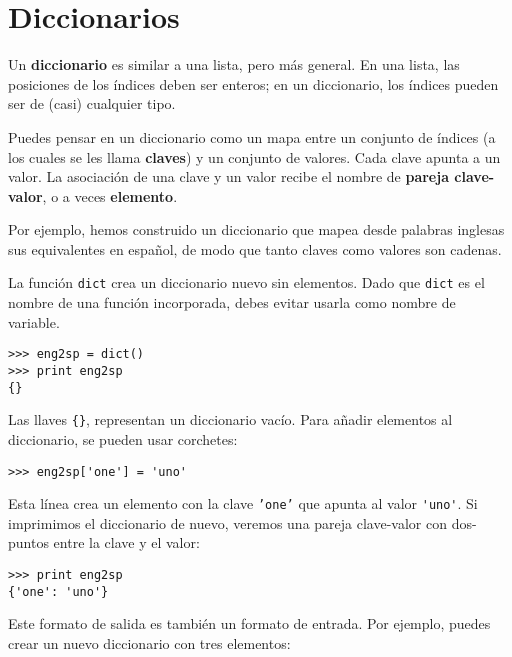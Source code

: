 
\chapter{Diccionarios}

Un {\bf diccionario} es similar a una lista, pero más general. En una lista,
las posiciones de los índices deben ser enteros; en un diccionario,
los índices pueden ser de (casi) cualquier tipo.

Puedes pensar en un diccionario como un mapa entre un conjunto de índices
(a los cuales se les llama {\bf claves}) y un conjunto de valores. Cada clave apunta a un
valor. La asociación de una clave y un valor recibe el nombre de {\bf
pareja clave-valor}, o a veces {\bf elemento}.

Por ejemplo, hemos construido un diccionario que mapea desde palabras inglesas
sus equivalentes en español, de modo que tanto claves como valores son cadenas.

La función {\tt dict} crea un diccionario nuevo sin elementos.
Dado que {\tt dict} es el nombre de una función incorporada, debes
evitar usarla como nombre de variable.


\beforeverb
\begin{verbatim}
>>> eng2sp = dict()
>>> print eng2sp
{}
\end{verbatim}
\afterverb

Las llaves \verb"{}", representan un diccionario vacío.
Para añadir elementos al diccionario, se pueden usar corchetes:


\beforeverb
\begin{verbatim}
>>> eng2sp['one'] = 'uno'
\end{verbatim}
\afterverb
%
Esta línea crea un elemento con la clave {\tt 'one'}
que apunta al valor \verb"'uno'". Si imprimimos el
diccionario de nuevo, veremos una pareja clave-valor con dos-puntos
entre la clave y el valor:

\beforeverb
\begin{verbatim}
>>> print eng2sp
{'one': 'uno'}
\end{verbatim}
\afterverb
%
Este formato de salida es también un formato de entrada. Por ejemplo,
puedes crear un nuevo diccionario con tres elementos:

